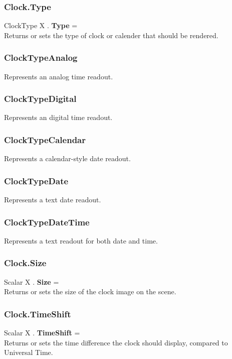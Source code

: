 \documentclass[10pt]{book}
\begin{document}
\subsubsection{Clock.Type \label{F:Clock:Type}}
ClockType X . \textbf{Type} = \\
Returns or sets the type of clock or calender that should be rendered.

\subsubsection{ClockTypeAnalog \label{T:ClockType|ClockTypeAnalog}}
Represents an analog time readout.

\subsubsection{ClockTypeDigital \label{T:ClockType|ClockTypeDigital}}
Represents an digital time readout.

\subsubsection{ClockTypeCalendar \label{T:ClockType|ClockTypeCalendar}}
Represents a calendar-style date readout.

\subsubsection{ClockTypeDate \label{T:ClockType|ClockTypeDate}}
Represents a text date readout.

\subsubsection{ClockTypeDateTime \label{T:ClockType|ClockTypeDateTime}}
Represents a text readout for both date and time.

\subsubsection{Clock.Size \label{F:Clock:Size}}
Scalar X . \textbf{Size} = \\
Returns or sets the size of the clock image on the scene.

\subsubsection{Clock.TimeShift \label{F:Clock:TimeShift}}
Scalar X . \textbf{TimeShift} = \\
Returns or sets the time difference the clock should display, compared to Universal Time.
\end{document}
